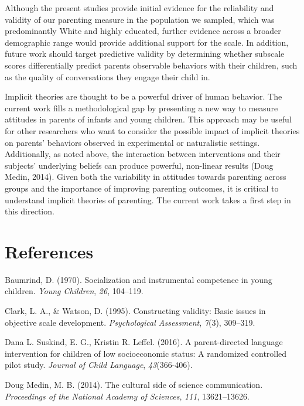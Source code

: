 \documentclass[floatsintext,man]{apa6}
\theoremstyle{definition}
\theoremstyle{definition}
\theoremstyle{definition}
\theoremstyle{remark}
\begin{document}
Although the present studies provide initial evidence for the
reliability and validity of our parenting measure in the population we
sampled, which was predominantly White and highly educated, further
evidence across a broader demographic range would provide additional
support for the scale. In addition, future work should target predictive
validity by determining whether subscale scores differentially predict
parents observable behaviors with their children, such as the quality of
conversations they engage their child in.

Implicit theories are thought to be a powerful driver of human behavior.
The current work fills a methodological gap by presenting a new way to
measure attitudes in parents of infants and young children. This
approach may be useful for other researchers who want to consider the
possible impact of implicit theories on parents' behaviors observed in
experimental or naturalistic settings. Additionally, as noted above, the
interaction between interventions and their subjects' underlying beliefs
can produce powerful, non-linear results (Doug Medin, 2014). Given both
the variability in attitudes towards parenting across groups and the
importance of improving parenting outcomes, it is critical to understand
implicit theories of parenting. The current work takes a first step in
this direction.

\newpage

\section{References}\label{references}

\begingroup
\setlength{\parindent}{-0.5in} \setlength{\leftskip}{0.5in}

\hypertarget{refs}{}
\hypertarget{ref-baumrind1970}{}
Baumrind, D. (1970). Socialization and instrumental competence in young
children. \emph{Young Children}, \emph{26}, 104--119.

\hypertarget{ref-clark1995}{}
Clark, L. A., \& Watson, D. (1995). Constructing validity: Basic issues
in objective scale development. \emph{Psychological Assessment},
\emph{7}(3), 309--319.

\hypertarget{ref-suskind2016}{}
Dana L. Suskind, E. G., Kristin R. Leffel. (2016). A parent-directed
language intervention for children of low socioeconomic status: A
randomized controlled pilot study. \emph{Journal of Child Language},
\emph{43}(366-406).

\hypertarget{ref-medin2014}{}
Doug Medin, M. B. (2014). The cultural side of science communication.
\emph{Proceedings of the National Academy of Sciences}, \emph{111},
13621--13626.
\end{document}
